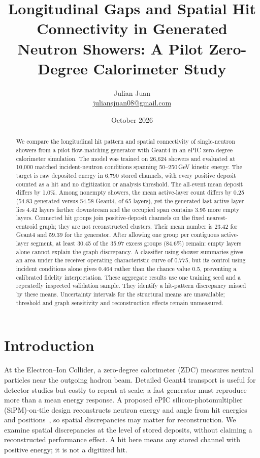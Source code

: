 \documentclass[10pt]{article}
\title{Longitudinal Gaps and Spatial Hit Connectivity in Generated\\Neutron Showers: A Pilot Zero-Degree Calorimeter Study}
\author{Julian Juan\\[3pt]\small\href{mailto:juliansjuan08@gmail.com}{juliansjuan08@gmail.com}}
\date{October 2026}
\begin{document}
\maketitle

\begin{abstract}
We compare the longitudinal hit pattern and spatial connectivity of single-neutron showers from a pilot flow-matching generator with Geant4 in an ePIC zero-degree calorimeter simulation. The model was trained on 26,624 showers and evaluated at 10,000 matched incident-neutron conditions spanning 50--250\,GeV kinetic energy. The target is raw deposited energy in 6,790 stored channels, with every positive deposit counted as a hit and no digitization or analysis threshold. The all-event mean deposit differs by 1.0\%. Among nonempty showers, the mean active-layer count differs by 0.25 (54.83 generated versus 54.58 Geant4, of 65 layers), yet the generated last active layer lies 4.42 layers farther downstream and the occupied span contains 3.95 more empty layers. Connected hit groups join positive-deposit channels on the fixed nearest-centroid graph; they are not reconstructed clusters. Their mean number is 23.42 for Geant4 and 59.39 for the generator. After allowing one group per contiguous active-layer segment, at least 30.45 of the 35.97 excess groups (84.6\%) remain: empty layers alone cannot explain the graph discrepancy. A classifier using shower summaries gives an area under the receiver operating characteristic curve of 0.775, but its control using incident conditions alone gives 0.464 rather than the chance value 0.5, preventing a calibrated fidelity interpretation. These aggregate results use one training seed and a repeatedly inspected validation sample. They identify a hit-pattern discrepancy missed by these means. Uncertainty intervals for the structural means are unavailable; threshold and graph sensitivity and reconstruction effects remain unmeasured.
\end{abstract}

\section{Introduction}

At the Electron--Ion Collider, a zero-degree calorimeter (ZDC) measures neutral particles near the outgoing hadron beam. Detailed Geant4 transport is useful for detector studies but costly to repeat at scale; a fast generator must reproduce more than a mean energy response. A proposed ePIC silicon-photomultiplier (SiPM)-on-tile design reconstructs neutron energy and angle from hit energies and positions~\cite{epiczdc}, so spatial discrepancies may matter for reconstruction. We examine spatial discrepancies at the level of stored deposits, without claiming a reconstructed performance effect. A hit here means any stored channel with positive energy; it is not a digitized hit.
\end{document}
